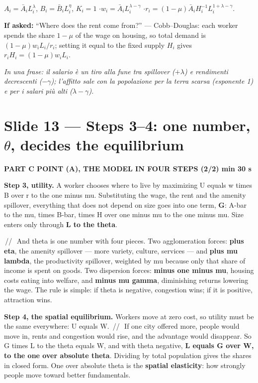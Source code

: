 \documentclass[11pt,a4paper]{article}
\newcommand{\slide}[3]{\Needspace{14\baselineskip}\section{#1}\textcolor{unicared}{\small\bfseries\MakeUppercase{#3}\quad\textperiodcentered\quad #2}\par}
\newcommand{\idea}[1]{\par{\small\itshape\color{unicablue}In una frase: #1}\par}
\newcommand{\pause}{\textcolor{unicared}{\,/\!/\,}}
\begin{document}
\begin{nums}
$A_i = \bar A_iL_i^{\lambda}$, $B_i = \bar B_iL_i^{\eta}$, $K_i = 1$ \quad$\cdot$\quad $w_i = \bar A_iL_i^{\lambda-\gamma}$ \quad$\cdot$\quad $r_i = (1-\mu)\bar A_iH_i^{-1}L_i^{1+\lambda-\gamma}$.
\end{nums}
\begin{ask}
\textbf{If asked:} ``Where does the rent come from?'' --- Cobb--Douglas: each worker spends the share $1-\mu$ of the wage on housing, so total demand is $(1-\mu)w_iL_i/r_i$; setting it equal to the fixed supply $H_i$ gives $r_iH_i = (1-\mu)w_iL_i$.
\end{ask}
\idea{il salario è un tiro alla fune tra spillover ($+\lambda$) e rendimenti decrescenti ($-\gamma$); l'affitto sale con la popolazione per la terra scarsa (esponente 1) e per i salari più alti ($\lambda-\gamma$).}

\slide{Slide 13 --- Steps 3--4: one number, $\theta$, decides the equilibrium}{1 min 30 s}{Part C \textperiodcentered{} point (a), the model in four steps (2/2)}

\begin{say}
\textbf{Step 3, utility.} A worker chooses where to live by maximizing U equals w times B over r to the one minus mu. Substituting the wage, the rent and the amenity spillover, everything that does not depend on size goes into one term, \textbf{G}: A-bar to the mu, times B-bar, times H over one minus mu to the one minus mu. Size enters only through \textbf{L to the theta}.

\pause\ And theta is one number with four pieces. Two agglomeration forces: \textbf{plus eta}, the amenity spillover --- more variety, culture, services --- and \textbf{plus mu lambda}, the productivity spillover, weighted by mu because only that share of income is spent on goods. Two dispersion forces: \textbf{minus one minus mu}, housing costs eating into welfare, and \textbf{minus mu gamma}, diminishing returns lowering the wage. The rule is simple: if theta is negative, congestion wins; if it is positive, attraction wins.

\textbf{Step 4, the spatial equilibrium.} Workers move at zero cost, so utility must be the same everywhere: U equals W. \pause\ If one city offered more, people would move in, rents and congestion would rise, and the advantage would disappear. So G times L to the theta equals W, and with theta negative, \textbf{L equals G over W, to the one over absolute theta}. Dividing by total population gives the shares in closed form. One over absolute theta is the \textbf{spatial elasticity}: how strongly people move toward better fundamentals.
\end{say}
\end{document}

